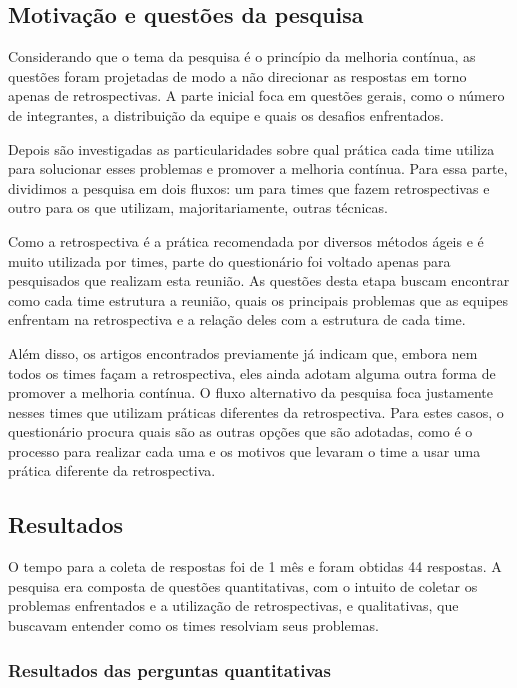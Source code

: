 \subsection{Motivação e questões da pesquisa}

Considerando que o tema da pesquisa é o princípio da melhoria contínua, as questões foram projetadas de modo a não direcionar as respostas em torno apenas de retrospectivas. A parte inicial foca em questões gerais, como o número de integrantes, a distribuição da equipe e quais os desafios enfrentados.

Depois são investigadas as particularidades sobre qual prática cada time utiliza para solucionar esses problemas e promover a melhoria contínua. Para essa parte, dividimos a pesquisa em dois fluxos: um para times que fazem retrospectivas e outro para os que utilizam, majoritariamente, outras técnicas.

Como a retrospectiva é a prática recomendada por diversos métodos ágeis e é muito utilizada por times, parte do questionário foi voltado apenas para pesquisados que  realizam esta reunião. As questões desta etapa buscam encontrar como cada time estrutura a reunião, quais os principais problemas que as equipes enfrentam na retrospectiva e a relação deles com a estrutura de cada time. 

Além disso, os artigos encontrados previamente já indicam que, embora nem todos os times façam a retrospectiva, eles ainda adotam alguma outra forma de promover a melhoria contínua. O fluxo alternativo da pesquisa foca justamente nesses times que utilizam práticas diferentes da retrospectiva. Para estes casos, o questionário procura quais são as outras opções que são adotadas, como é o processo para realizar cada uma e os motivos que levaram o time a usar uma prática diferente da retrospectiva.

\subsection{Resultados}

O tempo para a coleta de respostas foi de 1 mês e foram obtidas 44 respostas. A pesquisa era composta de questões quantitativas, com o intuito de coletar os problemas enfrentados e a utilização de retrospectivas, e qualitativas, que buscavam entender como os times resolviam seus problemas.

\subsubsection*{Resultados das perguntas quantitativas}

